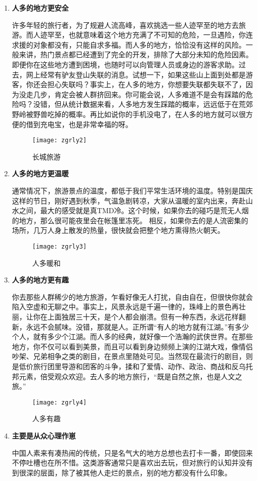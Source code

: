 \begin{enumerate}
    
\item \textbf{人多的地方更安全}

许多年轻的旅行者，为了规避人流高峰，喜欢挑选一些人迹罕至的地方去旅游。而人迹罕至，也就意味着这个地方充满了不可知的危险，一旦遇险，你连求援的对象都没有，只能自求多福。而人多的地方，恰恰没有这样的风险。一般来讲，热门景点都已经遭到了完全的开发，排除了大部分未知的危险因素。即便你在这些地方遭到困境，也随时可以向管理人员或身边的游客求助。过去，网上经常有驴友登山失联的消息。试想一下，如果这些山上面到处都是游客，你还会担心失联吗？事实上，在人多的地方，你想要失联都失联不了，因为没走几步，肯定会被人群挤回来。你可能会说，人多难道不是会有踩踏的危险吗？没错，但从统计数据来看，人多地方发生踩踏的概率，远远低于在荒郊野岭被野兽吃掉的概率。再比如说你的手机没电了，在人多的地方就可以很方便的借到充电宝，也是非常幸福的呀。
\begin{figure}[htb]
    \centering
    \texttt{[image: zgrly2]}
    \caption{长城旅游}
\end{figure}





\item \textbf{人多的地方更温暖}

通常情况下，旅游景点的温度，都低于我们平常生活环境的温度。特别是国庆这样的节日，刚好遇到秋季，气温急剧转凉，大家从温暖的室内出来，奔赴山水之间，最大的感受就是真TMD冷。这个时候，如果你去的碰巧是荒无人烟的地方，那么很可能夜里会在帐篷里冻死。 相反，如果你去的是人流密集的场所，几万人身上散发的热量，很快就会把整个地方熏得热火朝天。

\begin{figure}[htb]
    \centering
    \texttt{[image: zgrly3]}
    \caption{人多暖和}
\end{figure}



\item \textbf{人多的地方更有趣}

你去那些人群稀少的地方旅游，乍看好像无人打扰，自由自在，但很快你就会陷入空虚和无聊之中。事实上，风景永远是千遍一律的，珠峰上的景色再壮丽，让你在上面独居三十天，是个人都会崩溃。但有一种东西，永远花样翻新，永远不会腻味。没错，那就是人。正所谓“有人的地方就有江湖。”有多少个人，就有多少个江湖。而人多的经典，就好像一个浩瀚的武侠世界。在那些地方，你不仅可以看到美景，而且可以看到身边频频上演的江湖大戏，像情侣吵架、兄弟相争之类的剧目，在景点里随处可见。当然现在最流行的剧目，则是低价旅行团里导游和团客的斗争，揉和了爱情、动作、政治、商战和反乌托邦元素，倍受观众欢迎。去人多的地方旅行，“既是自然之旅，也是人文之旅。”
\begin{figure}[htb]
    \centering
    \texttt{[image: zgrly4]}
    \caption{人多有趣}
\end{figure}


\item \textbf{主要是从众心理作崽}

中国人素来有凑热闹的传统，只是名气大的地方总想也去打卡一番，即使回来不停吐槽也在所不惜。这类游客通常只是喜欢出去玩，但对旅行的认知并没有到很深的层面，除了被其他人走烂的景点，别的地方都没有什么印象。
\end{enumerate}

